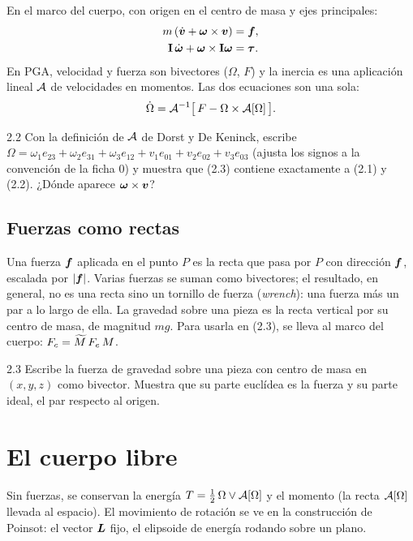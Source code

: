 \documentclass[11pt,a4paper]{article}
\begin{document}
En el marco del cuerpo, con origen en el centro de masa y ejes principales:
\begin{align}
  m\,(\dot{\bm{v}} + \bm{\omega}\times\bm{v}) &= \bm{f},\\
  \mathbf I\,\dot{\bm{\omega}} + \bm{\omega}\times\mathbf I\bm{\omega} &= \bm{\tau} .
\end{align}
En PGA, velocidad y fuerza son bivectores ($\Omega$, $F$) y la inercia es una aplicación lineal $\mathcal{A}$ de velocidades en
momentos. Las dos ecuaciones son una sola:
\begin{equation}
  \dot\Omega = \mathcal{A}^{-1}\bigl[\,F - \Omega\times\mathcal{A}[\Omega]\,\bigr].
\end{equation}

\begin{ejercicio}{2.2}
Con la definición de $\mathcal{A}$ de Dorst y De Keninck, escribe $\Omega = \omega_1e_{23}+\omega_2e_{31}+\omega_3e_{12}
+ v_1e_{01}+v_2e_{02}+v_3e_{03}$ (ajusta los signos a la convención de la ficha 0) y muestra que (2.3) contiene
exactamente a (2.1) y (2.2). ¿Dónde aparece $\bm{\omega}\times\bm{v}$?
\end{ejercicio}

\subsection{Fuerzas como rectas}
Una fuerza $\bm{f}$ aplicada en el punto $P$ es la recta que pasa por $P$ con dirección $\bm{f}$, escalada por
$\lvert\bm{f}\rvert$. Varias fuerzas se suman como bivectores; el resultado, en general, no es una recta sino un
tornillo de fuerza (\emph{wrench}): una fuerza más un par a lo largo de ella. La gravedad sobre una pieza es la recta
vertical por su centro de masa, de magnitud $mg$. Para usarla en (2.3), se lleva al marco del cuerpo:
$F_c = \widetilde{M}\,F_e\,M$.

\begin{ejercicio}{2.3}
Escribe la fuerza de gravedad sobre una pieza con centro de masa en $(x, y, z)$ como bivector. Muestra que su parte
euclídea es la fuerza y su parte ideal, el par respecto al origen.
\end{ejercicio}

\section{El cuerpo libre}

Sin fuerzas, se conservan la energía $T = \tfrac12\,\Omega\vee\mathcal{A}[\Omega]$ y el momento (la recta $\mathcal{A}[\Omega]$ llevada
al espacio). El movimiento de rotación se ve en la construcción de Poinsot: el vector $\bm{L}$ fijo, el elipsoide de
energía rodando sobre un plano.
\end{document}
